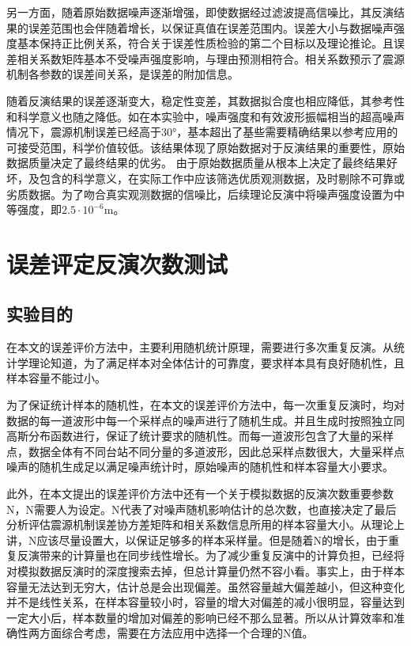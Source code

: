 另一方面，随着原始数据噪声逐渐增强，即使数据经过滤波提高信噪比，其反演结果的误差范围也会伴随着增长，以保证真值在误差范围内。误差大小与数据噪声强度基本保持正比例关系，符合关于误差性质检验的第二个目标以及理论推论。且误差相关系数矩阵基本不受噪声强度影响，与理由预测相符合。相关系数预示了震源机制各参数的误差间关系，是误差的附加信息。

随着反演结果的误差逐渐变大，稳定性变差，其数据拟合度也相应降低，其参考性和科学意义也随之降低。如在本实验中，噪声强度和有效波形振幅相当的超高噪声情况下，震源机制误差已经高于30°，基本超出了基些需要精确结果以参考应用的可接受范围，科学价值较低。该结果体现了原始数据对于反演结果的重要性，原始数据质量决定了最终结果的优劣。
由于原始数据质量从根本上决定了最终结果好坏，及包含的科学意义，在实际工作中应该筛选优质观测数据，及时剔除不可靠或劣质数据。为了吻合真实观测数据的信噪比，后续理论反演中将噪声强度设置为中等强度，即$2.5\cdot10^{-6}$m。

\section{误差评定反演次数测试}
\subsection{实验目的}
在本文的误差评价方法中，主要利用随机统计原理，需要进行多次重复反演。从统计学理论知道，为了满足样本对全体估计的可靠度，要求样本具有良好随机性，且样本容量不能过小。

为了保证统计样本的随机性，在本文的误差评价方法中，每一次重复反演时，均对数据的每一道波形中每一个采样点的噪声进行了随机生成。并且生成时按照独立同高斯分布函数进行，保证了统计要求的随机性。而每一道波形包含了大量的采样点，数据全体有不同台站不同分量的多道波形，因此总采样点数很大，大量采样点噪声的随机生成足以满足噪声统计时，原始噪声的随机性和样本容量大小要求。

此外，在本文提出的误差评价方法中还有一个关于模拟数据的反演次数重要参数N，N需要人为设定。N代表了对噪声随机影响估计的总次数，也直接决定了最后分析评估震源机制误差协方差矩阵和相关系数信息所用的样本容量大小。从理论上讲，N应该尽量设置大，以保证足够多的样本采样量。但是随着N的增长，由于重复反演带来的计算量也在同步线性增长。为了减少重复反演中的计算负担，已经将对模拟数据反演时的深度搜索去掉，但总计算量仍然不容小看。事实上，由于样本容量无法达到无穷大，估计总是会出现偏差。虽然容量越大偏差越小，但这种变化并不是线性关系，在样本容量较小时，容量的增大对偏差的减小很明显，容量达到一定大小后，样本数量的增加对偏差的影响已经不那么显著。所以从计算效率和准确性两方面综合考虑，需要在方法应用中选择一个合理的N值。

